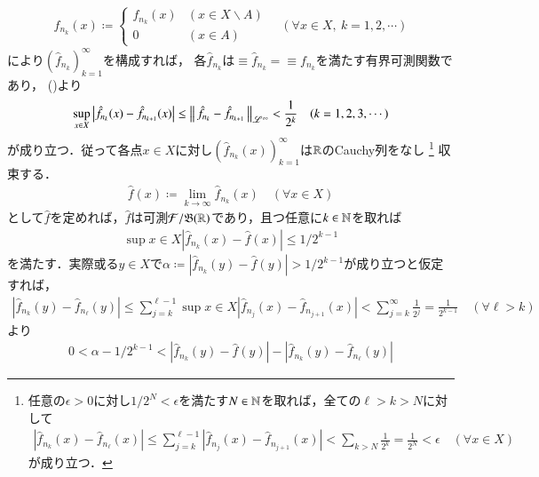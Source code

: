 \begin{prf}
\begin{description}
\begin{align}
				\hat{f}_{n_k}(x) \coloneqq
				\begin{cases}
					f_{n_k}(x) & (x \in X \backslash A) \\
					0 & (x \in A)
				\end{cases}
				\quad (\forall x \in X,\ k=1,2,\cdots)
			\end{align}
			により$\left( \hat{f}_{n_k} \right)_{k=1}^{\infty}$を構成すれば，
			各$\hat{f}_{n_k}$は$\equiv{\hat{f}_{n_k}}{} = \equiv{f_{n_k}}{}$を満たす有界可測関数であり，
			()より
			\begin{align}
				\operatorname*{sup}_{x \in X} \left|\hat{f}_{n_k}(x) - \hat{f}_{n_{k+1}}(x)\right|
				\leq \left\|\, \hat{f}_{n_k} - \hat{f}_{n_{k+1}}\, \right\|_{\mathscr{L}^\infty} < \frac{1}{2^k} \quad (k=1,2,3,\cdots) 
				\label{ineq:Lp_banach_1}
			\end{align}
			が成り立つ．従って各点$x \in X$に対し$\left( \hat{f}_{n_k}(x) \right)_{k=1}^{\infty}$は$\mathbb{R}$のCauchy列をなし
			\footnote{
				任意の$\epsilon > 0$に対し$1/2^N < \epsilon$を満たす$N \in \mathbb{N}$を取れば，全ての$\ell > k > N$に対して
				\begin{align}
					\left|\hat{f}_{n_k}(x) - \hat{f}_{n_{\ell}}(x)\right| 
					\leq \sum_{j=k}^{\ell-1}\left|\hat{f}_{n_j}(x) - \hat{f}_{n_{j+1}}(x)\right| 
					< \sum_{k > N} \frac{1}{2^k} = \frac{1}{2^N} < \epsilon
					\quad (\forall x \in X)
				\end{align}
				が成り立つ．
			}
			収束する．
			\begin{align}
				\hat{f}(x) \coloneqq \lim_{k \to \infty} \hat{f}_{n_k}(x)
				\quad (\forall x \in X)
			\end{align}
			として$\hat{f}$を定めれば，$\hat{f}$は可測$\mathcal{F}/\mathfrak{B}(\mathbb{R})$であり，且つ任意に$k \in \mathbb{N}$を取れば
			\begin{align}
				\sup{x \in X}{|\hat{f}_{n_k}(x) - \hat{f}(x)|} \leq 1/2^{k-1} \label{ineq:Lp_banach_3}
			\end{align}
			を満たす．実際或る$y \in X$で$\alpha \coloneqq |\hat{f}_{n_k}(y) - \hat{f}(y)| > 1/2^{k-1}$が成り立つと仮定すれば，
			\begin{align}
				\left| \hat{f}_{n_k}(y) - \hat{f}_{n_\ell}(y) \right|
				\leq \sum_{j=k}^{\ell-1} \sup{x \in X}{\left|\hat{f}_{n_j}(x) - \hat{f}_{n_{j+1}}(x)\right|}
				< \sum_{j=k}^{\infty} \frac{1}{2^j}
				= \frac{1}{2^{k-1}}
				\quad (\forall \ell > k)
			\end{align}
			より
			\begin{align}
				0 < \alpha - 1/2^{k-1} < \left| \hat{f}_{n_k}(y) - \hat{f}(y) \right| - \left| \hat{f}_{n_k}(y) - \hat{f}_{n_\ell}(y) \right|

\end{align}
\end{description}
\end{prf}

